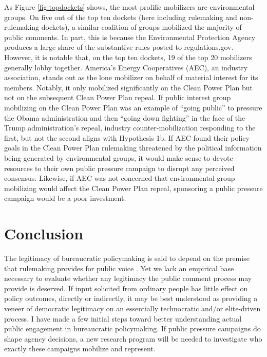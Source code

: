 \documentclass[
      12pt,
        ]{article}
\begin{document}
As Figure \ref{fig:topdockets} shows, the most prolific mobilizers are
environmental groups. On five out of the top ten dockets (here including
rulemaking and non-rulemaking dockets), a similar coalition of groups
mobilized the majority of public comments. In part, this is because the
Environmental Protection Agency produces a large share of the
substantive rules posted to regulations.gov. However, it is notable
that, on the top ten dockets, 19 of the top 20 mobilizers generally
lobby together. America's Energy Cooperatives (AEC), an industry association,
stands out as the lone mobilizer on behalf of material interest for its
members. Notably, it only mobilized significantly on the Clean Power
Plan but not on the subsequent Clean Power Plan repeal. If public
interest group mobilizing on the Clean Power Plan was an example of
``going public'' to pressure the Obama administration and then ``going
down fighting'' in the face of the Trump administration's repeal,
industry counter-mobilization responding to the first, but not the
second aligns with Hypothesis 1b. If AEC found their policy goals in the Clean Power Plan rulemaking threatened by the political information being generated by environmental groups, it would make sense to devote resources to their own public pressure campaign to disrupt any perceived consensus. Likewise, if AEC was not concerned that environmental group mobilizing would affect the Clean Power Plan repeal, sponsoring a public pressure campaign would be a poor investment.

\hypertarget{conclusion}{%
\section{Conclusion}\label{conclusion}}

The legitimacy of bureaucratic policymaking is said to depend on the premise that rulemaking provides for public voice \citep[\citet{Rosenbloom2003}]{Croley2003}. Yet we lack an empirical base necessary to evaluate whether any legitimacy the public comment process may provide is deserved. If input solicited from ordinary people has little effect on policy outcomes, directly or indirectly, it may be best understood as providing a veneer of democratic legitimacy on an essentially technocratic and/or elite-driven process. I have made a few initial steps toward better understanding actual public engagement in bureaucratic policymaking.
If public pressure campaigns do shape agency decisions, a new research program will be needed to investigate who exactly these campaigns mobilize and represent.
\end{document}

